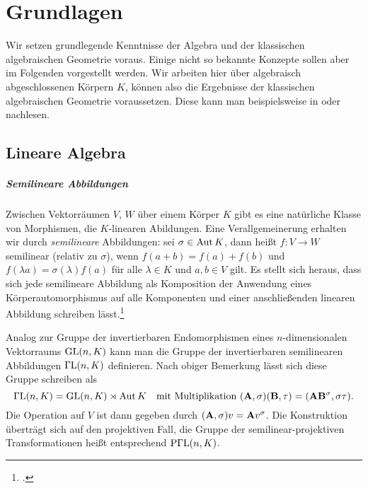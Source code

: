 \chapter{Grundlagen} \label{chap:prelim}
Wir setzen grundlegende Kenntnisse der Algebra und der klassischen algebraischen Geometrie voraus. Einige nicht so bekannte Konzepte sollen aber im Folgenden vorgestellt werden. Wir arbeiten hier über algebraisch abgeschlossenen Körpern $K$, können also die Ergebnisse der klassischen algebraischen Geometrie voraussetzen. Diese kann man beispielsweise in \cite{Shafarevich} oder \cite{Mumford} nachlesen.

\section{Lineare Algebra}
\paragraph{Semilineare Abbildungen} Zwischen Vektorräumen $V$, $W$ über einem Körper $K$ gibt es eine natürliche Klasse von Morphismen, die $K$-linearen Abildungen. Eine Verallgemeinerung erhalten wir durch \emph{semilineare} Abbildungen: sei $\sigma \in \operatorname{Aut} K$, dann heißt $f: V \to W$ semilinear (relativ zu $\sigma$), wenn $f(a+b) = f(a) + f(b)$ und $f(\lambda a) = \sigma(\lambda)f(a)$ für alle $\lambda \in K$ und $a, b \in V$ gilt. Es stellt sich heraus, dass sich jede semilineare Abbildung als Komposition der Anwendung eines Körperautomorphismus auf alle Komponenten und einer anschließenden linearen Abbildung schreiben lässt.\footcite[Das folgt leicht aus den Bemerkungen in][S.~2--3]{Dieudonne}

Analog zur Gruppe der invertierbaren Endomorphismen eines $n$-dimensionalen Vektorraums $\mathrm{GL}(n,K)$ kann man die Gruppe der invertierbaren semilinearen Abbildungen $\mathrm{\Gamma L}(n,K)$ definieren. Nach obiger Bemerkung lässt sich diese Gruppe schreiben als
\begin{equation}
\mathrm{\Gamma L}(n,K) = \mathrm{GL}(n,K) \rtimes \operatorname{Aut} K \quad\text{mit Multiplikation } (\mathbf{A}, \sigma)(\mathbf{B}, \tau) = (\mathbf{A} \mathbf{B}^\sigma, \sigma \tau).
\end{equation}
Die Operation auf $V$ ist dann gegeben durch $(\mathbf{A}, \sigma)v = \mathbf{A} v^\sigma$. Die Konstruktion überträgt sich auf den projektiven Fall, die Gruppe der semilinear-projektiven Transformationen heißt entsprechend $\mathrm{P\Gamma L}(n,K)$.

